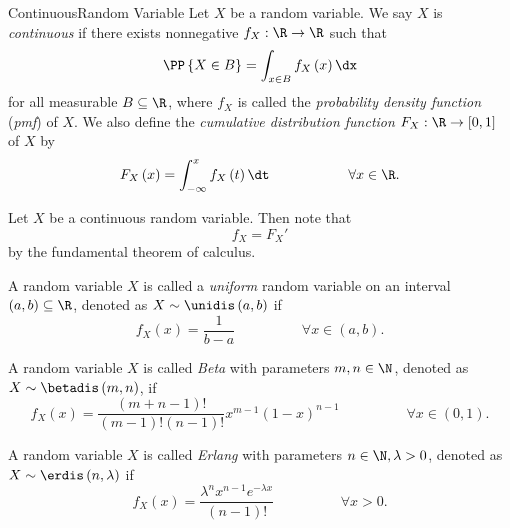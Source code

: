 \documentclass[stat333]{subfiles}
\begin{document}
    \begin{definition}{Continuous}{Random Variable}
        Let $X$ be a random variable. We say $X$ is \emph{continuous} if there exists nonnegative $f_X:\R\to\R$ such that
        \begin{equation*}
            \PP\left\lbrace X\in B \right\rbrace = \int^{}_{x\in B} f_X\left( x \right) \dx
        \end{equation*}
        for all measurable $B\subseteq\R$, where $f_X$ is called the \emph{probability density function} (\emph{pmf}) of $X$. We also define the \emph{cumulative distribution function} $F_X:\R\to\left[ 0,1 \right]$ of $X$ by
        \begin{equation*}
            F_X\left( x \right) = \int^{x}_{-\infty} f_X\left( t \right) \dt \hspace{2cm}\forall x\in\R.
        \end{equation*}
    \end{definition}

    \np Let $X$ be a continuous random variable. Then note that
    \begin{equation*}
        f_X = F_X'
    \end{equation*}
    by the fundamental theorem of calculus.

    \np[Uniform]A random variable $X$ is called a \emph{uniform} random variable on an interval $\left( a,b \right) \subseteq\R$, denoted as $X\sim\unidis\left( a,b \right)$ if 
    \begin{equation*}
        f_X\left( x \right) = \frac{1}{b-a} \hspace{2cm}\forall x\in\left( a,b \right) .
    \end{equation*}

    \np[Beta]A random variable $X$ is called \emph{Beta} with parameters $m,n\in\N$, denoted as $X\sim\betadis\left( m,n \right)$, if
    \begin{equation*}
        f_X\left( x \right) = \frac{\left( m+n-1 \right) !}{\left( m-1 \right) !\left( n-1 \right) !}x^{m-1}\left( 1-x \right) ^{n-1} \hspace{2cm}\forall x\in\left( 0,1 \right) .
    \end{equation*}

    \np[Erlang]A random variable $X$ is called \emph{Erlang} with parameters $n\in\N, \lambda>0$, denoted as $X\sim\erdis\left( n,\lambda \right)$ if
    \begin{equation*}
        f_X\left( x \right) = \frac{\lambda^nx^{n-1}e^{-\lambda x}}{\left( n-1 \right) !} \hspace{2cm}\forall x>0.
    \end{equation*}
\end{document}
